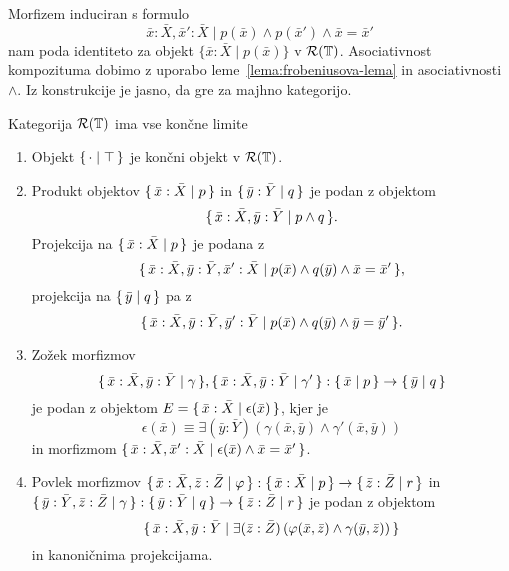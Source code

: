 \documentclass[../kategoricna_logika.tex]{subfiles}
\begin{document}
  \begin{opomba}
    Morfizem induciran s formulo
    $$\bar{x}:\bar{X}, \bar{x}':\bar{X} \mid p(\bar{x}) \land p(\bar{x}') \land \bar{x} = \bar{x}'$$
    nam poda identiteto za objekt $\{\bar{x}:\bar{X} \mid p(\bar{x})\}$ v $\mathcal{R}(\mathbb{T})$. Asociativnost kompozituma
    dobimo z uporabo leme~\ref{lema:frobeniusova-lema} in asociativnosti $\land$.
    Iz konstrukcije je jasno, da gre za majhno kategorijo.
  \end{opomba}
  \begin{lema}\label{lema:limite-v-sintaktični-kategoriji}
    Kategorija $\mathcal{R}(\mathbb{T})$ ima vse končne limite
    \begin{enumerate}[label=(\roman*)]
    \item Objekt $\lbrace\,\cdot  \mid  \top\,\rbrace$ je končni objekt v
      $\mathcal{R}(\mathbb{T})$.
    \item Produkt objektov $\lbrace\,\bar{x}:\bar{X} \mid  p\,\rbrace$ in
      $\lbrace\,\bar{y}:\bar{Y} \mid  q\,\rbrace$ je podan z objektom
      $$\lbrace\,\bar{x}:\bar{X},\bar{y}:\bar{Y} \mid  p \wedge q\,\rbrace.$$
      Projekcija na
      $\lbrace\,\bar{x}:\bar{X} \mid  p\,\rbrace$ je podana z
      $$\lbrace\,\bar{x}:\bar{X}, \bar{y}:\bar{Y},\bar{x}':\bar{X} \mid
        p(\bar{x}) \wedge q(\bar{y}) \wedge \bar{x} = \bar{x}'\,\rbrace,$$
      projekcija na $\lbrace\,\bar{y} \mid  q\,\rbrace$ pa z
      $$\lbrace\,\bar{x}:\bar{X},\bar{y}:\bar{Y},\bar{y}':\bar{Y} \mid
        p(\bar{x}) \wedge q(\bar{y}) \wedge \bar{y} = \bar{y}'\,\rbrace.$$
    \item Zožek morfizmov
      $$\lbrace\,\bar{x}:\bar{X},\bar{y}:\bar{Y} \mid \gamma\,\rbrace, \lbrace\,\bar{x}:\bar{X},\bar{y}:\bar{Y} \mid \gamma'\,\rbrace :
      \lbrace\,\bar{x} \mid  p\,\rbrace \to \lbrace\,\bar{y} \mid  q\,\rbrace$$
      je podan z objektom
      $E = \lbrace\,\bar{x}:\bar{X} \mid  \epsilon(\bar{x})\,\rbrace$, kjer je
      $$\epsilon(\bar{x}) \equiv \exists (\bar{y}:\bar{Y})\left(\gamma(\bar{x},\bar{y}) \wedge \gamma'(\bar{x},\bar{y})\right)$$
      in morfizmom
      $\lbrace\,\bar{x}:\bar{X},\bar{x}':\bar{X} \mid  \epsilon(\bar{x}) \wedge
        \bar{x} = \bar{x}'\,\rbrace$.
    \item Povlek morfizmov
      $\lbrace\,\bar{x}:\bar{X},\bar{z}:\bar{Z} \mid \varphi\,\rbrace : \lbrace\,\bar{x}:\bar{X} \mid  p\,\rbrace \to
      \lbrace\,\bar{z}:\bar{Z} \mid  r\,\rbrace$ in
      $\lbrace\,\bar{y}:\bar{Y},\bar{z}:\bar{Z} \mid \gamma\,\rbrace : \lbrace\,\bar{y}:\bar{Y} \mid  q\,\rbrace \to
      \lbrace\,\bar{z}:\bar{Z} \mid  r\,\rbrace$ je podan z objektom
      $$\lbrace\,\bar{x}:\bar{X},\bar{y}:\bar{Y} \mid \exists (\bar{z}:\bar{Z}) \left(\varphi(\bar{x},\bar{z}) \wedge \gamma(\bar{y},\bar{z})\right)\,\rbrace$$
      in kanoničnima projekcijama.
    \end{enumerate}
  \end{lema}
\end{document}

